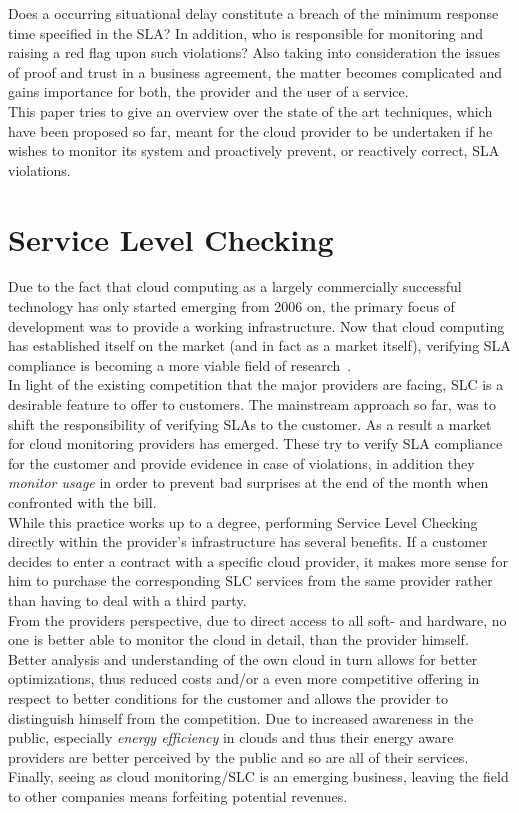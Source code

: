 \documentclass[a4paper]{llncs}
\begin{document}
Does a occurring situational delay constitute a breach of the minimum response time specified in the SLA? In addition, who is responsible for monitoring and raising a red flag upon such violations? Also taking into consideration the issues of proof and trust in a business agreement, the matter becomes complicated and gains importance for both, the provider and the user of a service.\\

This paper tries to give an overview over the state of the art techniques, which have been proposed so far, meant for the cloud provider to be undertaken if he wishes to monitor its system and proactively prevent, or reactively correct, SLA violations.\\

\section{Service Level Checking}
Due to the fact that cloud computing as a largely commercially successful technology has only started emerging from 2006 on, the primary focus of development was to provide a working infrastructure. Now that cloud computing has established itself on the market (and in fact as a market itself), verifying SLA compliance is becoming a more viable field of research~\cite{Emeakaroha10a}.\\
In light of the existing competition that the major providers are facing, SLC is a desirable feature to offer to customers. The mainstream approach so far, was to shift the responsibility of verifying SLAs to the customer. As a result a market for cloud monitoring providers has emerged. These try to verify SLA compliance for the customer and provide evidence in case of violations, in addition they \textit{monitor usage} in order to prevent bad surprises at the end of the month when confronted with the bill.\\

While this practice works up to a degree, performing Service Level Checking directly within the provider’s infrastructure has several benefits. If a customer decides to enter a contract with a specific cloud provider, it makes more sense for him to purchase the corresponding SLC services from the same provider rather than having to deal with a third party.\\

From the providers perspective, due to direct access to all soft- and hardware, no one is better able to monitor the cloud in detail, than the provider himself. Better analysis and understanding of the own cloud in turn allows for better optimizations, thus reduced costs and/or a even more competitive offering in respect to better conditions for the customer and allows the provider to distinguish himself from the competition. Due to increased awareness in the public, especially \textit{energy efficiency} in clouds and thus their energy aware providers are better perceived by the public and so are all of their services.\\
Finally, seeing as cloud monitoring/SLC is an emerging business, leaving the field to other companies means forfeiting potential revenues.\\
\end{document}

